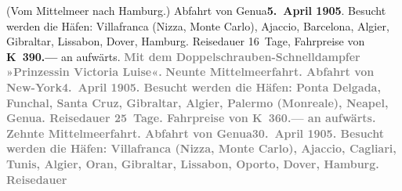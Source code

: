 \begin{ledgroupsized}[t]{13cm}
{{                  (Vom Mittelmeer nach Hamburg.) Abfahrt von Genua\textbf{5. April 1905}. Besucht werden die Häfen: Villafranca
                     (Nizza, Monte
                     Carlo), Ajaccio, Barcelona, Algier, Gibraltar, Lissabon, Dover, Hamburg. Reisedauer 16 Tage, Fahrpreise von \textbf{K 390.—} an aufwärts.}}\pend
           {\bigskip}\pstart
           \noindent{}\centering{}\textcolor{gray}{\textbf{Mit dem Doppelschrauben-Schnelldampfer »Prinzessin Victoria
                  Luise«.}}\pend
           \pstart
           \noindent{}\textcolor{gray}{\textbf{\textbf{Neunte Mittelmeerfahrt.}
                  Abfahrt von New-York\textbf{4. April 1905}. Besucht werden die Häfen: Ponta Delgada,
                     Funchal, Santa
                     Cruz, Gibraltar, Algier, Palermo (Monreale), Neapel, Genua. Reisedauer 25 Tage.
                  Fahrpreise von \textbf{K 360.—} an aufwärts.}}\pend
           \pstart
           \textcolor{gray}{\textbf{\textbf{Zehnte Mittelmeerfahrt.}
                  Abfahrt von Genua\textbf{30. April 1905}. Besucht werden die Häfen: Villafranca
                     (Nizza, Monte
                     Carlo), Ajaccio, Cagliari, Tunis, Algier, Oran,
                     Gibraltar, Lissabon, Oporto, Dover, Hamburg. Reisedauer
}}
\end{ledgroupsized}
